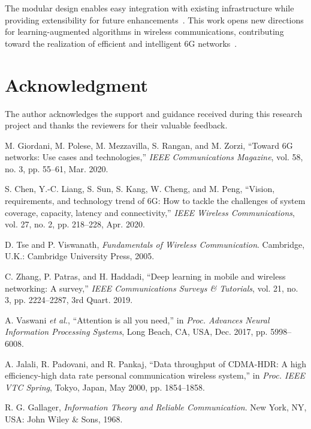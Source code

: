 \documentclass[conference]{IEEEtran}
\begin{document}
The modular design enables easy integration with existing infrastructure while providing extensibility for future enhancements~\cite{hybrid_systems}. This work opens new directions for learning-augmented algorithms in wireless communications, contributing toward the realization of efficient and intelligent 6G networks~\cite{energy_efficient_6g}.

\section*{Acknowledgment}

The author acknowledges the support and guidance received during this research project and thanks the reviewers for their valuable feedback.

\begin{thebibliography}{20}
 M. Giordani, M. Polese, M. Mezzavilla, S. Rangan, and M. Zorzi, ``Toward 6G networks: Use cases and technologies,'' \textit{IEEE Communications Magazine}, vol. 58, no. 3, pp. 55--61, Mar. 2020.

 S. Chen, Y.-C. Liang, S. Sun, S. Kang, W. Cheng, and M. Peng, ``Vision, requirements, and technology trend of 6G: How to tackle the challenges of system coverage, capacity, latency and connectivity,'' \textit{IEEE Wireless Communications}, vol. 27, no. 2, pp. 218--228, Apr. 2020.

 D. Tse and P. Viswanath, \textit{Fundamentals of Wireless Communication}. Cambridge, U.K.: Cambridge University Press, 2005.

 C. Zhang, P. Patras, and H. Haddadi, ``Deep learning in mobile and wireless networking: A survey,'' \textit{IEEE Communications Surveys \& Tutorials}, vol. 21, no. 3, pp. 2224--2287, 3rd Quart. 2019.

 A. Vaswani \textit{et al.}, ``Attention is all you need,'' in \textit{Proc. Advances Neural Information Processing Systems}, Long Beach, CA, USA, Dec. 2017, pp. 5998--6008.

 A. Jalali, R. Padovani, and R. Pankaj, ``Data throughput of CDMA-HDR: A high efficiency-high data rate personal communication wireless system,'' in \textit{Proc. IEEE VTC Spring}, Tokyo, Japan, May 2000, pp. 1854--1858.

 R. G. Gallager, \textit{Information Theory and Reliable Communication}. New York, NY, USA: John Wiley \& Sons, 1968.


\end{thebibliography}
\end{document}
